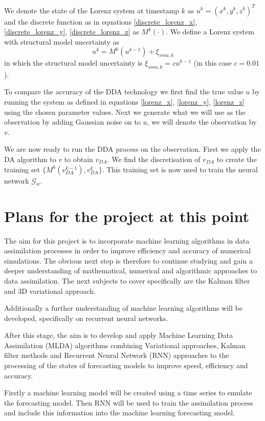 \documentclass[english]{article}
\begin{document}
We denote the state of the Lorenz system at timestamp $k$ as $u^k = (x^k, y^k, z^k)^T$ and the discrete function as in equations \ref{discrete_lorenz_x}, \ref{discrete_lorenz_y}, \ref{discrete_lorenz_z} as $M^k(\cdot)$. We define a Lorenz system with structural model uncertainty as
\begin{equation}
	u^k = M^k(u^{k-1}) + \xi_{smu,k}
\end{equation}
in which the structural model uncertainty is $\xi_{smu,k} = c u^{k-1}$ (in this case $c = 0.01$).

To compare the accuracy of the DDA technology we first find the true value $u$ by running the system as defined in equations \ref{lorenz_x}, \ref{lorenz_y}, \ref{lorenz_z} using the chosen parameter values. Next we generate what we will use as the observation by adding Gaussian noise on to $u$, we will denote the observation by $v$. 

We are now ready to run the DDA process on the observation. First we apply the DA algorithm to $v$ to obtain $v_{DA}$. We find the discretisation of $v_{DA}$ to create the training set $\{M^k(v^{k-1}_{DA}),v^k_{DA}\}$. This training set is now used to train the neural network $\mathcal{G}_w$.
\section{Plans for the project at this point}
The aim for this project is to incorporate machine learning algorithms in data assimilation processes in order to improve efficiency and accuracy of numerical simulations. The obvious next step is therefore to continue studying and gain a deeper understanding of mathematical, numerical and algorithmic approaches to data assimilation. The next subjects to cover specifically are the Kalman filter and 3D variational approach.

Additionally a further understanding of machine learning algorithms will be developed, specifically on recurrent neural networks.

After this stage, the aim is to develop and apply Machine Learning Data Assimilation (MLDA) algorithms combining Variational approaches, Kalman filter methods and Recurrent Neural Network (RNN) approaches to the processing of the states of forecasting models to improve speed, efficiency and accuracy. 

Firstly a machine learning model will be created using a time series to emulate the forecasting model. Then RNN will be used to train the assimilation process and include this information into the machine learning forecasting model. 
\end{document}
